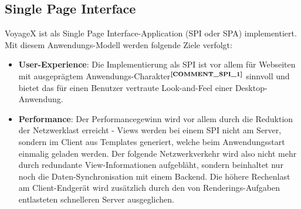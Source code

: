 \subsection{Single Page Interface}\label{5_SPI}

VoyageX ist als Single Page Interface-Application (SPI oder SPA) implementiert. Mit diesem Anwendungs-Modell werden folgende Ziele verfolgt:

\begin{itemize}[leftmargin=*,noitemsep,topsep=1ex,parsep=0pt,partopsep=0pt]
\item \textbf{User-Experience}: Die Implementierung als SPI ist vor allem für Webseiten mit ausgeprägtem Anwendungs-Charakter$^{\textbf{\ref{COMMENT_SPI_1}}}$ sinnvoll und bietet das für einen Benutzer vertraute Look-and-Feel einer Desktop-Anwendung.%
\addtocounter{footnote}{1}
\item \textbf{Performance}: Der Performancegewinn wird vor allem durch die Reduktion der Netzwerklast erreicht - Views werden bei einem SPI nicht am Server, sondern im Client aus Templates generiert, welche beim Anwendungsstart einmalig geladen werden. Der folgende Netzwerkverkehr wird also nicht mehr durch redundante View-Informationen aufgebläht, sondern beinhaltet nur noch die Daten-Synchronisation mit einem Backend. Die höhere Rechenlast am Client-Endgerät wird zusätzlich durch den von Renderings-Aufgaben entlasteten schnelleren Server ausgeglichen.
\end{itemize}




